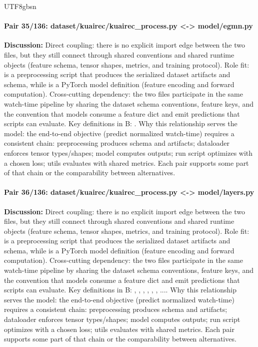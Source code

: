 \documentclass[11pt]{article}
\begin{document}
\begin{CJK*}{UTF8}{gbsn}
\paragraph{Pair 35/136: dataset/kuairec/kuairec\_process.py <-> model/egmn.py}
\textbf{Discussion:} Direct coupling: there is no explicit import edge between the two files, but they still connect through shared conventions and shared runtime objects (feature schema, tensor shapes, metrics, and training protocol). Role fit: \texttt{} is a preprocessing script that produces the serialized dataset artifacts and schema, while \texttt{} is a PyTorch model definition (feature encoding and forward computation). Cross-cutting dependency: the two files participate in the same watch-time pipeline by sharing the dataset schema conventions, feature keys, and the convention that models consume a feature dict and emit predictions that scripts can evaluate. Key definitions in B: \texttt{}. Why this relationship serves the model: the end-to-end objective (predict normalized watch-time) requires a consistent chain: preprocessing produces schema and artifacts; dataloader enforces tensor types/shapes; model computes outputs; run script optimizes with a chosen loss; utils evaluates with shared metrics. Each pair supports some part of that chain or the comparability between alternatives.

\paragraph{Pair 36/136: dataset/kuairec/kuairec\_process.py <-> model/layers.py}
\textbf{Discussion:} Direct coupling: there is no explicit import edge between the two files, but they still connect through shared conventions and shared runtime objects (feature schema, tensor shapes, metrics, and training protocol). Role fit: \texttt{} is a preprocessing script that produces the serialized dataset artifacts and schema, while \texttt{} is a PyTorch model definition (feature encoding and forward computation). Cross-cutting dependency: the two files participate in the same watch-time pipeline by sharing the dataset schema conventions, feature keys, and the convention that models consume a feature dict and emit predictions that scripts can evaluate. Key definitions in B: \texttt{}, \texttt{}, \texttt{}, \texttt{}, \texttt{}, \texttt{}, .... Why this relationship serves the model: the end-to-end objective (predict normalized watch-time) requires a consistent chain: preprocessing produces schema and artifacts; dataloader enforces tensor types/shapes; model computes outputs; run script optimizes with a chosen loss; utils evaluates with shared metrics. Each pair supports some part of that chain or the comparability between alternatives.


\end{CJK*}
\end{document}

